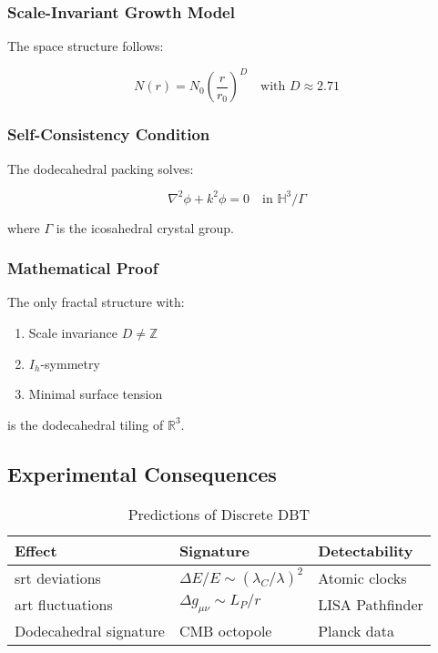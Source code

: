 \subsubsection{Scale-Invariant Growth Model}  
The space structure follows:  

\begin{equation}  
N(r) = N_0\left(\frac{r}{r_0}\right)^D \quad \text{with } D \approx 2.71  
\end{equation}  

\subsubsection{Self-Consistency Condition}  
The dodecahedral packing solves:  

\begin{equation}  
\nabla^2\phi + k^2\phi = 0 \quad \text{in } \mathbb{H}^3/\Gamma  
\end{equation}  

where $\Gamma$ is the icosahedral crystal group.  

\subsubsection{Mathematical Proof}  
\begin{theorem}  
The only fractal structure with:  
\begin{enumerate}  
\item Scale invariance $D \neq \mathbb{Z}$  
\item $I_h$-symmetry  
\item Minimal surface tension  
\end{enumerate}  
is the dodecahedral tiling of $\mathbb{R}^3$.  
\end{theorem}  

\subsection{Experimental Consequences}  
\label{subsec:experiments}  

\begin{table}[ht]
\centering  
\caption{Predictions of Discrete DBT}  
\begin{tabular}{lll}  
\hline  
Effect & Signature & Detectability \\  
\hline  
\gls{srt} deviations & $\Delta E/E \sim (\lambda_C/\lambda)^2$ & Atomic clocks \\  
\gls{art} fluctuations & $\Delta g_{\mu\nu} \sim L_P/r$ & LISA Pathfinder \\  
Dodecahedral signature & CMB octopole & Planck data \\  
\hline
\end{tabular}  
\end{table}  

